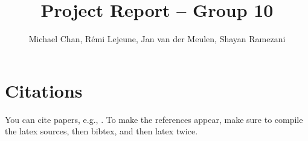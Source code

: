 \documentclass[sigconf,nonacm]{acmart}
\title{Project Report -- Group 10}
\author{Michael Chan, Rémi Lejeune, Jan van der Meulen, Shayan Ramezani}
\begin{document}

% 

\maketitle












\section{Citations}

You can cite papers, e.g., \cite{test-ref}.
To make the references appear, make sure to compile the latex sources, then bibtex, and then latex twice.


\end{document}
